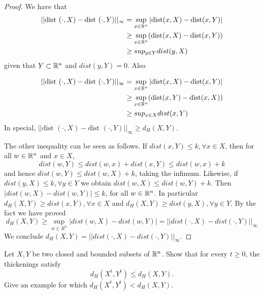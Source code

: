 \begin{proof}

We have that 
\begin{equation*}
    \begin{split}
        ||\text{dist }(\cdot, X) - \text{dist }(\cdot, Y)||_{\infty} &= \sup_{x \in \mathbb{R}^n} |\text{dist}(x, X) - \text{dist}(x, Y)| \\
        &\ge \sup_{x \in \mathbb{R}^n} (\text{dist}(x, X) - \text{dist}(x, Y)) \\
        &\ge sup_{y \in Y} dist(y,X)
    \end{split}
\end{equation*}
given that $Y \subset \mathbb{R}^n$ and $dist(y,Y) = 0$. Also

\begin{equation*}
    \begin{split}
        ||\text{dist }(\cdot, X) - \text{dist }(\cdot, Y)||_{\infty} &= \sup_{x \in \mathbb{R}^n} |\text{dist}(x, X) - \text{dist}(x, Y)| \\
        &\ge \sup_{x \in \mathbb{R}^n} (\text{dist}(x, Y) - \text{dist}(x, X)) \\
        &\ge sup_{x \in X} dist(x,Y)
    \end{split}
\end{equation*}
In special, $||\text{dist }(\cdot, X) - \text{dist }(\cdot, Y)||_{\infty} \ge
d_H(X,Y)$. 

The other inequality can be seen as follows. If $dist(x,Y) \le k, \forall x \in X$, then for all $w \in \mathbb{R}^n$ and $x \in
X$, $$dist(w,Y) \le dist(w,x) + dist(x,Y) \le dist(w,x) + k$$ and hence
$dist(w,Y) \le dist(w,X) + k$, taking the infimum. Likewise, if $dist(y,X) \le
k, \forall y \in Y$ we obtain $dist(w, X) \le dist(w,Y) + k$. Then 
$|dist(w,X) - dist(w,Y)| \le k$, for all $w \in \mathbb{R}^n$.
In particular $d_H(X,Y) \ge dist(x,Y), \forall x \in X$ and $d_H(X,Y) \ge
dist(y,X), \forall y \in Y$. By the fact we have proved 
$$
d_H(X,Y) \ge \sup_{w \in R^n}|dist(w,X) - dist(w,Y)| = ||dist(\cdot, X) - dist(\cdot, Y)||_{\infty}
$$
We conclude $d_H(X,Y) = ||dist(\cdot, X) - dist(\cdot, Y)||_{\infty}$. 

\end{proof}

\noindent\linia

\begin{exercise}
    Let $X, Y$ be two closed and bounded subsets of $\mathbb{R}^n$. Show that for
    every $t \ge 0$, the thickenings satisfy 
    $$
    d_H(X^t, Y^t) \le d_H(X, Y).
    $$ 
    Give an example for which $d_H(X^t, Y^t) < d_H(X, Y)$.
\end{exercise}

